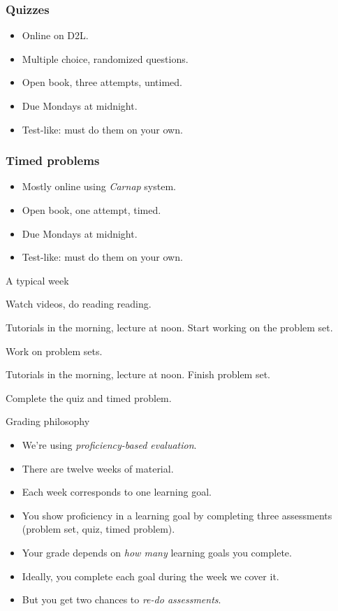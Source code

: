 \begin{frame}
  \frametitle{Quizzes}

  \begin{itemize}[<+->]
    \item Online on D2L.
    \item Multiple choice, randomized questions.
    \item Open book, three attempts, untimed.
    \item Due Mondays at midnight.
    \item Test-like: must do them on your own.
  \end{itemize}
\end{frame}

\begin{frame}
  \frametitle{Timed problems}

  \begin{itemize}[<+->]
    \item Mostly online using \textit{Carnap} system.
    \item Open book, one attempt, timed.
    \item Due Mondays at midnight.
    \item Test-like: must do them on your own.
  \end{itemize}
\end{frame}

\begin{frame}{A typical week}

  \begin{description}[<+->]
    \item[Monday \& Tuesday] Watch videos, do reading reading.
    \item[Wednesday] Tutorials in the morning, lecture at noon.
        Start working on the problem set.
    \item[Thursday] Work on problem sets.
    \item[Friday] Tutorials in the morning, lecture at noon.
    Finish problem set.
    \item [Saturday--Monday] Complete the quiz and timed
    problem.
  \end{description}
\end{frame}

\begin{frame}{Grading philosophy}
  \begin{itemize}[<+->]
    \item We're using \emph{proficiency-based evaluation}.
    \item There are twelve weeks of material.
    \item Each week corresponds to one learning goal.
    \item You show proficiency in a learning goal by completing three
    assessments (problem set, quiz, timed problem).
    \item Your grade depends on \emph{how many} learning goals you complete.
    \item Ideally, you complete each goal during the week we cover it.
    \item But you get two chances to \emph{re-do assessments}.
  \end{itemize}
\end{frame}

